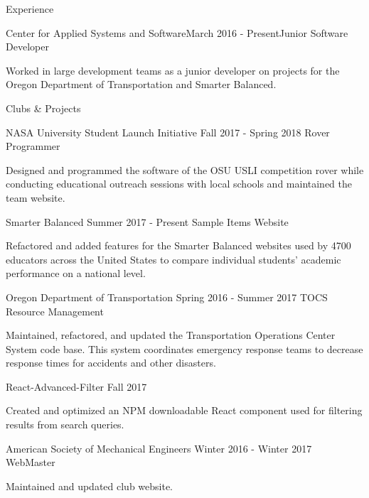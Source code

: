 \documentclass{resume} %
\begin{document}
\begin{rSection}{Experience}

  \begin{rSubsection}{Center for Applied Systems and Software}{March 2016 - Present}{Junior Software Developer}{}
  \item Worked in large development teams as a junior developer on projects for the Oregon  Department of Transportation and Smarter Balanced.
  \end{rSubsection}

\end{rSection}


\begin{rSection}{Clubs \& Projects}
  
    
  \begin{rSubsection} {NASA University Student Launch Initiative} {Fall 2017 - Spring 2018} {Rover Programmer} {}
  \item Designed and programmed the software of the OSU USLI competition rover while conducting educational outreach sessions with local schools and maintained the team website.
  \end{rSubsection}

  \begin{rSubsection} {Smarter Balanced} {Summer 2017 - Present} {Sample Items Website} {}
  \item Refactored and added features for the Smarter Balanced websites used by 4700 educators across the United States to compare individual students' academic performance on a national level.
  \end{rSubsection}

  \begin{rSubsection} {Oregon Department of Transportation} {Spring 2016 - Summer 2017} {TOCS Resource Management} {}
  \item Maintained, refactored, and updated the Transportation Operations Center System code base. This system coordinates emergency response teams to decrease response times for accidents and other disasters.
  \end{rSubsection}

  \begin{rSubsection} {React-Advanced-Filter} {Fall 2017} {} {}
  \item Created and optimized an NPM downloadable React component used for filtering results from search queries.
  \end{rSubsection}

  \begin{rSubsection} {American Society of Mechanical Engineers} {Winter 2016 - Winter 2017} {WebMaster} {}
  \item Maintained and updated club website.
  \end{rSubsection}

\end{rSection}
\end{document}
